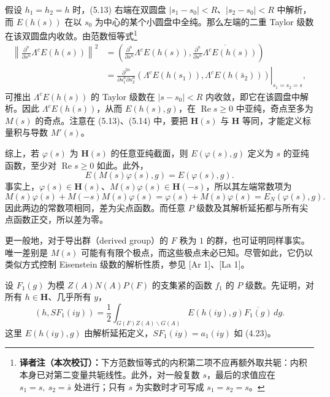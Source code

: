 假设 $h_1=h_2=h$ 时，(5.13) 右端在双圆盘 $|s_1-s_0|<R$、$|s_2-s_0|<R$ 中解析，而
$E(h(s))$ 在以 $s_0$ 为中心的某个小圆盘中全纯。那么左端的二重 Taylor 级数在该双圆盘内收敛。由范数恒等式\footnote{\textbf{译者注（本次校订）：}下方范数恒等式的内积第二项不应再额外取共轭：内积本身已对第二变量共轭线性。此外，对一般复数 $s$，最后的求值应在 $s_1=s,\ s_2=\bar s$ 处进行；只有 $s$ 为实数时才可写成 $s_1=s_2=s$。}
\[
\begin{split}
 \left\|\frac{\partial^n}{\partial s^n}\Lambda^cE(h(s))\right\|^2
 &=\left(\frac{\partial^n}{\partial s^n}\Lambda^cE(h(s)),
 \overline{\frac{\partial^n}{\partial s^n}\Lambda^cE(h(s))}\right)\\
 &=\left.\frac{\partial^{2n}}{\partial s_1^n\partial s_2^n}
 (\Lambda^cE(h(s_1)),\Lambda^cE(h(\bar s_2)))\right|_{s_1=s_2=s},
\end{split}
\]
可推出 $\Lambda^cE(h(s))$ 的 Taylor 级数在 $|s-s_0|<R$ 内收敛，即它在该圆盘中解析。因此
$\Lambda^cE(h(s))$，从而 $E(h(s),g)$，在 $\operatorname{Re}s\ge0$ 中亚纯，奇点至多为
$M(s)$ 的奇点。注意在 (5.13)、(5.14) 中，要把 $\mathbf H(s)$ 与 $\mathbf H$ 等同，才能定义标量积与导数 $M'(s)$。

综上，若 $\varphi(s)$ 为 $\mathbf H(s)$ 的任意亚纯截面，则 $E(\varphi(s),g)$ 定义为 $s$ 的亚纯函数，至少对 $\operatorname{Re}s\ge0$ 如此。此外，
\begin{equation}
 E(M(s)\varphi(s),g)=E(\varphi(s),g).\tag{5.15}
\end{equation}
事实上，$\varphi(s)\in\mathbf H(s)$、$M(s)\varphi(s)\in\mathbf H(-s)$，所以其左端常数项为
\[
 M(s)\varphi(s)+M(-s)M(s)\varphi(s)
 =\varphi(s)+M(s)\varphi(s)=E_N(\varphi(s),g).
\]
因此两边的常数项相同，差为尖点函数。而任意 $P$ 级数及其解析延拓都与所有尖点函数正交，所以差为零。

更一般地，对于导出群（derived group）的 $F$ 秩为 $1$ 的群，也可证明同样事实。唯一差别是
$M(s)$ 可能有有限个极点，而这些极点未必已知。尽管如此，它仍以类似方式控制 Eisenstein 级数的解析性质，参见 [Ar 1]、[La 1]。

设 $F_1(g)$ 为模 $Z(A)N(A)P(F)$ 的支集紧的函数 $f_1$ 的 $P$ 级数。先证明，对所有
$h\in\mathbf H$、几乎所有 $y$，
\begin{equation}
 (h,SF_1(iy))=\frac12\int_{G(F)Z(A)\backslash G(A)}E(h(iy),g)\overline{F_1(g)}\,dg.\tag{5.16}
\end{equation}
这里 $E(h(iy),g)$ 由解析延拓定义，$SF_1(iy)=a_1(iy)$ 如 (4.23)。

